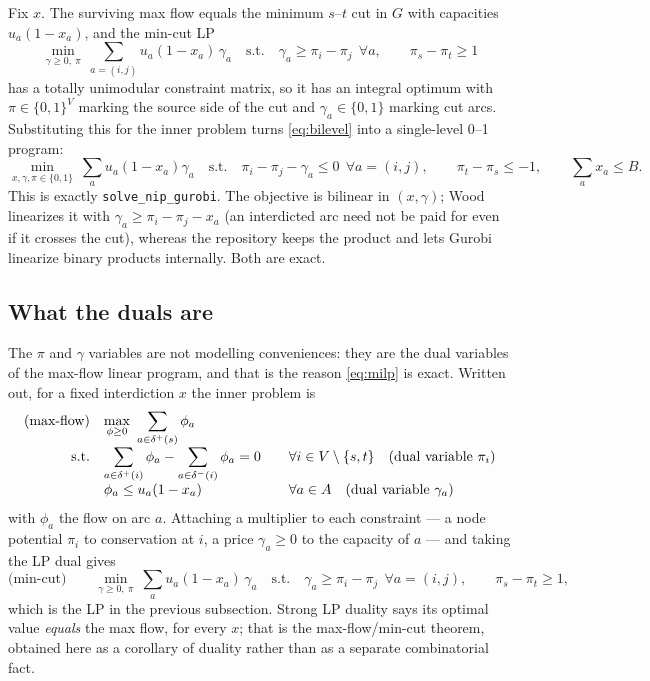 \documentclass[11pt]{article}
\newcommand{\code}[1]{\texttt{#1}}
\begin{document}
Fix $x$. The surviving max flow equals the minimum $s$--$t$ cut in $G$ with capacities $u_a(1-x_a)$, and the min-cut LP
\[
\min_{\gamma \ge 0,\ \pi}\ \sum_{a=(i,j)} u_a (1-x_a)\,\gamma_a
\quad \text{s.t.}\quad \gamma_a \ge \pi_i - \pi_j\ \ \forall a,\qquad \pi_s - \pi_t \ge 1
\]
has a totally unimodular constraint matrix, so it has an integral optimum with $\pi \in \{0,1\}^V$ marking the source side of the cut and $\gamma_a \in \{0,1\}$ marking cut arcs. Substituting this for the inner problem turns \eqref{eq:bilevel} into a single-level 0--1 program:
\begin{equation}
\label{eq:milp}
\min_{x,\gamma,\pi \in \{0,1\}}\ \sum_a u_a(1-x_a)\gamma_a
\quad\text{s.t.}\quad \pi_i - \pi_j - \gamma_a \le 0\ \ \forall a=(i,j),\qquad \pi_t - \pi_s \le -1,\qquad \sum_a x_a \le B .
\end{equation}
This is exactly \code{solve\_nip\_gurobi}. The objective is bilinear in $(x,\gamma)$; Wood linearizes it with $\gamma_a \ge \pi_i - \pi_j - x_a$ (an interdicted arc need not be paid for even if it crosses the cut), whereas the repository keeps the product and lets Gurobi linearize binary products internally. Both are exact.

\subsection{What the duals are}
\label{sec:duals}

The $\pi$ and $\gamma$ variables are not modelling conveniences: they are the dual variables of the max-flow linear program, and that is the reason \eqref{eq:milp} is exact. Written out, for a fixed interdiction $x$ the inner problem is
\[
\begin{array}{r@{\quad}l@{\qquad}l}
\text{(max-flow)} & \displaystyle \max_{\phi \ge 0}\ \sum_{a \in \delta^{+}(s)} \phi_a
  & \\[1ex]
\text{s.t.} & \displaystyle \sum_{a \in \delta^{+}(i)} \phi_a - \sum_{a \in \delta^{-}(i)} \phi_a = 0 & \forall i \in V\setminus\{s,t\} \quad \text{(dual variable } \pi_i\text{)} \\[1ex]
 & \phi_a \le u_a (1-x_a) & \forall a \in A \quad \text{(dual variable } \gamma_a\text{)}
\end{array}
\]
with $\phi_a$ the flow on arc $a$. Attaching a multiplier to each constraint --- a node potential $\pi_i$ to conservation at $i$, a price $\gamma_a \ge 0$ to the capacity of $a$ --- and taking the LP dual gives
\[
\text{(min-cut)}\qquad \min_{\gamma \ge 0,\ \pi}\ \sum_a u_a(1-x_a)\,\gamma_a
\quad\text{s.t.}\quad \gamma_a \ge \pi_i - \pi_j\ \ \forall a=(i,j),\qquad \pi_s - \pi_t \ge 1 ,
\]
which is the LP in the previous subsection. Strong LP duality says its optimal value \emph{equals} the max flow, for every $x$; that is the max-flow/min-cut theorem, obtained here as a corollary of duality rather than as a separate combinatorial fact.
\end{document}
